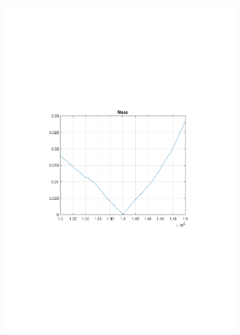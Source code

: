 \begin{frame}[c]
\begin{columns}[c]
\begin{figure}
			\end{figure}
			\vspace{-0.6cm}
			\begin{figure}
				\centering
				\includegraphics[trim=4cm 9cm 4cm 9.5cm, clip=true, width=\linewidth]{img/mass}
			\end{figure}
	\end{columns}
\end{frame}

